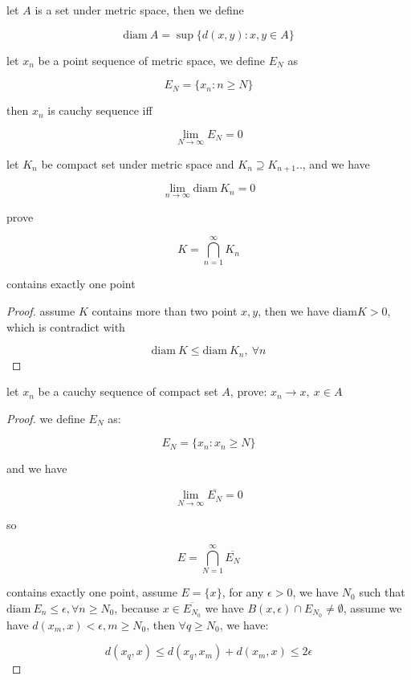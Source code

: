\begin{definition}[diam]
    let $A$ is a set under metric space, then we define

    \[
        \text{diam}\: A  = \sup \{ d(x,y) : x,y \in A \}
    \]
\end{definition}

\begin{definition}
    let $x_n$ be a point sequence of metric space, we define $E_N$ as

    \[
        E_N = \{ x_n : n \ge N \}
    \]

    then $x_n$ is cauchy sequence iff

    \[
        \lim_{N \to \infty}E_N = 0
    \]
\end{definition}


\begin{exercise}
    let $K_n$ be compact set under metric space and $K_n \supseteq K_{n+1} .. $, and we have

    \[
        \lim_{n \to \infty} \text{diam}\: K_n = 0
    \]

    prove 

    \[
        K = \bigcap_{n=1}^{\infty}K_n
    \]

    contains exactly one point
\end{exercise}

\begin{proof}
    assume $K$ contains more than two point $x,y$, then we have $\text{diam} K > 0$, which is contradict with

    \[
        \text{diam}\: K \le \text{diam}\:K_n,\: \forall n
    \]
\end{proof}

\begin{exercise}
    let $x_n$ be a cauchy sequence of compact set $A$, prove: $x_n \to x,\: x \in A$
\end{exercise}

\begin{proof}
    we define $E_N$ as: 

    \[
        E_N = \{ x_n : x_n \ge N \}
    \]

    and we have

    \[
        \lim_{N \to \infty} \overline{E_N} = 0
    \]

    so

    \[
        E = \bigcap_{N=1}^{\infty} \overline{E_N}
    \]

    contains exactly one point, assume $E = \{ x \}$, for any $\epsilon > 0$, we have $N_0$ such that $\text{diam}\: E_n \le \epsilon, \forall n \ge N_0$,
    because $x \in \overline{E_{N_0}}$ we have $B(x, \epsilon) \cap E_{N_0} \ne \emptyset$, assume we have $d(x_m, x) < \epsilon, m \ge N_0$, then $\forall q \ge N_0$, we have:

    \[
        d(x_q, x) \le d(x_q, x_m) + d(x_m, x) \le 2 \epsilon
    \]
\end{proof}


